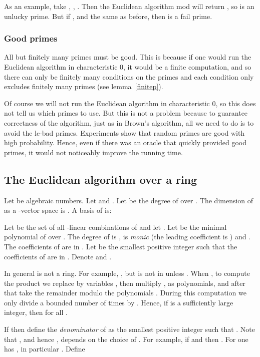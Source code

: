 \documentclass[10pt]{article}
\newcommand{\bad}{lc-bad }
\begin{document}
As an example, take , ,
. Then the Euclidean algorithm mod 
will return , so  is an unlucky prime.
But if ,  and  the same as before,
then  is a fail prime.

\subsubsection{Good primes}
\label{goodprimes}
All but finitely many primes must be good. This is because
if one would run the Euclidean algorithm in characteristic 0,
it would be a finite computation, and so there can only be finitely
many conditions on the primes and each condition only excludes
finitely many primes (see lemma~\ref{finitep}).





Of course we will not run the Euclidean algorithm
in characteristic 0, so this does not tell us which primes to use.
But this is not a problem because
to guarantee correctness of the
algorithm, just as in Brown's algorithm,
all we need to do is to avoid the \bad primes.
Experiments show that random primes are good with high probability. Hence,
even if there was an oracle that quickly provided good primes, it would not
noticeably improve the running time.
 \subsection{The Euclidean algorithm over a ring}
\label{sectionEucl}
Let  be algebraic numbers.
Let  and .
Let  be the degree of  over
.
The dimension of  as a -vector space is .
A basis of  is:

Let  be the set of all -linear combinations of 
and let .
Let  be the minimal polynomial of 
over . The degree of  is ,  is {\em monic} (the leading
coefficient is )
and .
The coefficients of  are in .
Let  be the smallest positive integer such that the coefficients
of  are in .
Denote  and .

In general  is not a ring.
For example, , but  is not
in  unless .
When , to compute the product  we
replace  by variables ,
then multiply ,
as polynomials, and after that
take the remainder modulo the polynomials .
During this computation we only divide a bounded number of times by 
. Hence, if  is a sufficiently large integer, then
 for all .


If  then define the {\em denominator} of  as the smallest
positive integer  such that .
Note that , and hence , depends on the choice of
.
For example, if 
and  then .
For  one has ,
in particular .
Define
\end{document}
